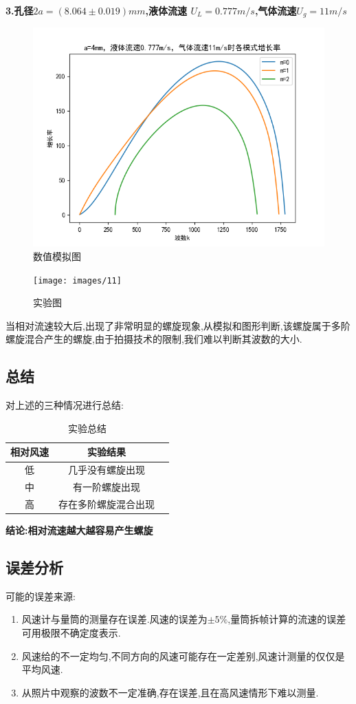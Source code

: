 \documentclass[UTF8]{gapd}
\begin{document}
\textbf{3.孔径$2a=(8.064 \pm 0.019)mm$,液体流速 $U_{L}=0.777m/s$,气体流速$U_{g}=11m/s$                  }
\begin{figure}[H]
	\centering
	\includegraphics[width=0.8\linewidth]{images/Figure_4}
	\caption{数值模拟图}
	\label{fig:P24}
\end{figure}
\begin{figure}[H]
	\centering
	\texttt{[image: images/11]}
	\caption{实验图}
	\label{fig:P25}
\end{figure}    

当相对流速较大后,出现了非常明显的螺旋现象,从模拟和图形判断,该螺旋属于多阶螺旋混合产生的螺旋,由于拍摄技术的限制,我们难以判断其波数的大小.

\subsection{总结}
对上述的三种情况进行总结:
\begin{table}[H]
\begin{tabular}{ccc}
	\toprule[1.5pt]
	相对风速&实验结果	\\ 
	\midrule[0.75pt]
	低&几乎没有螺旋出现\\
	中&有一阶螺旋出现\\
	高&存在多阶螺旋混合出现\\
	\bottomrule[1.5pt]
\end{tabular}
\caption{实验总结}
\end{table}

\textbf{结论:相对流速越大越容易产生螺旋}
\subsection{误差分析}

可能的误差来源:
\begin{enumerate}
	\item 风速计与量筒的测量存在误差.风速的误差为$	\pm 5\%	$,量筒拆帧计算的流速的误差可用极限不确定度表示.
	\item 风速给的不一定均匀,不同方向的风速可能存在一定差别,风速计测量的仅仅是平均风速.
	\item 从照片中观察的波数不一定准确,存在误差,且在高风速情形下难以测量.
\end{enumerate}
\end{document}
